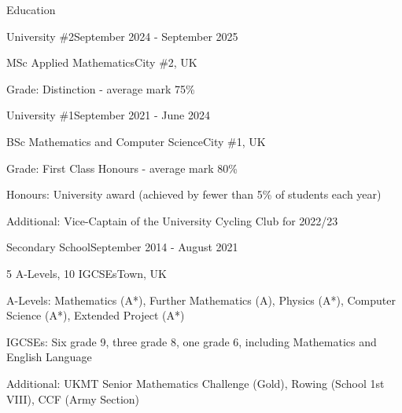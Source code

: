 \documentclass[10pt,a4paper]{CV}
\begin{document}

\begin{Section}{Education}
    \begin{Institution}{University \#2}{September 2024 - September 2025}
        \begin{Position}{MSc Applied Mathematics}{City \#2, UK}
            \item Grade: Distinction - average mark 75\%
        \end{Position}
    \end{Institution}
    \begin{Institution}{University \#1}{September 2021 - June 2024}
        \begin{Position}{BSc Mathematics and Computer Science}{City \#1, UK}
            \item Grade: First Class Honours - average mark 80\%
            \item Honours: University award (achieved by fewer than 5\% of students each year)
            \item Additional: Vice-Captain of the University Cycling Club for 2022/23
        \end{Position}
    \end{Institution}

    \begin{Institution}{Secondary School}{September 2014 - August 2021}
        \begin{Position}{5 A-Levels, 10 IGCSEs}{Town, UK}
            \item A-Levels: Mathematics (A*), Further Mathematics (A), Physics (A*), Computer Science (A*), Extended Project (A*)
            \item IGCSEs: Six grade 9, three grade 8, one grade 6, including Mathematics and English Language
            \item Additional: UKMT Senior Mathematics Challenge (Gold), Rowing (School 1st VIII), CCF (Army Section)
        \end{Position}
    \end{Institution}
\end{Section}
\end{document}
